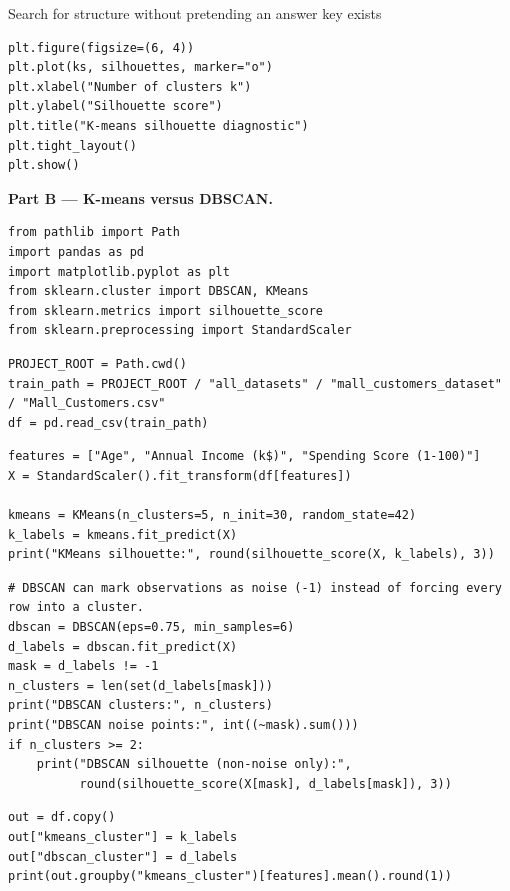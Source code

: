 \begin{labproject}{Search for structure without pretending an answer key exists}
\begin{lstlisting}[style=mlpython]
plt.figure(figsize=(6, 4))
plt.plot(ks, silhouettes, marker="o")
plt.xlabel("Number of clusters k")
plt.ylabel("Silhouette score")
plt.title("K-means silhouette diagnostic")
plt.tight_layout()
plt.show()
\end{lstlisting}

\medskip\noindent\textbf{Part B --- K-means versus DBSCAN.}\par
\begin{lstlisting}[style=mlpython]
from pathlib import Path
import pandas as pd
import matplotlib.pyplot as plt
from sklearn.cluster import DBSCAN, KMeans
from sklearn.metrics import silhouette_score
from sklearn.preprocessing import StandardScaler
\end{lstlisting}

\begin{lstlisting}[style=mlpython]
PROJECT_ROOT = Path.cwd()
train_path = PROJECT_ROOT / "all_datasets" / "mall_customers_dataset" / "Mall_Customers.csv"
df = pd.read_csv(train_path)
\end{lstlisting}

\begin{lstlisting}[style=mlpython]
features = ["Age", "Annual Income (k$)", "Spending Score (1-100)"]
X = StandardScaler().fit_transform(df[features])

kmeans = KMeans(n_clusters=5, n_init=30, random_state=42)
k_labels = kmeans.fit_predict(X)
print("KMeans silhouette:", round(silhouette_score(X, k_labels), 3))
\end{lstlisting}

\begin{lstlisting}[style=mlpython]
# DBSCAN can mark observations as noise (-1) instead of forcing every row into a cluster.
dbscan = DBSCAN(eps=0.75, min_samples=6)
d_labels = dbscan.fit_predict(X)
mask = d_labels != -1
n_clusters = len(set(d_labels[mask]))
print("DBSCAN clusters:", n_clusters)
print("DBSCAN noise points:", int((~mask).sum()))
if n_clusters >= 2:
    print("DBSCAN silhouette (non-noise only):",
          round(silhouette_score(X[mask], d_labels[mask]), 3))
\end{lstlisting}

\begin{lstlisting}[style=mlpython]
out = df.copy()
out["kmeans_cluster"] = k_labels
out["dbscan_cluster"] = d_labels
print(out.groupby("kmeans_cluster")[features].mean().round(1))
\end{lstlisting}


\end{labproject}
